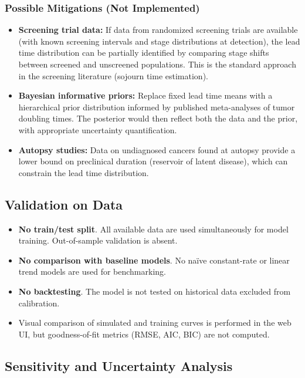 \documentclass[12pt,a4paper]{article}
\begin{document}
\subsubsection{Possible Mitigations (Not Implemented)}

\begin{itemize}[nosep]
    \item \textbf{Screening trial data:} If data from randomized screening trials are available (with known screening intervals and stage distributions at detection), the lead time distribution can be partially identified by comparing stage shifts between screened and unscreened populations. This is the standard approach in the screening literature (sojourn time estimation).
    \item \textbf{Bayesian informative priors:} Replace fixed lead time means with a hierarchical prior distribution informed by published meta-analyses of tumor doubling times. The posterior would then reflect both the data and the prior, with appropriate uncertainty quantification.
    \item \textbf{Autopsy studies:} Data on undiagnosed cancers found at autopsy provide a lower bound on preclinical duration (reservoir of latent disease), which can constrain the lead time distribution.
\end{itemize}

\subsection{Validation on Data}

\begin{itemize}[nosep]
    \item \textbf{No train/test split}. All available data are used simultaneously for model training. Out-of-sample validation is absent.
    \item \textbf{No comparison with baseline models}. No naïve constant-rate or linear trend models are used for benchmarking.
    \item \textbf{No backtesting}. The model is not tested on historical data excluded from calibration.
    \item Visual comparison of simulated and training curves is performed in the web UI, but goodness-of-fit metrics (RMSE, AIC, BIC) are not computed.
\end{itemize}

\subsection{Sensitivity and Uncertainty Analysis}
\end{document}
